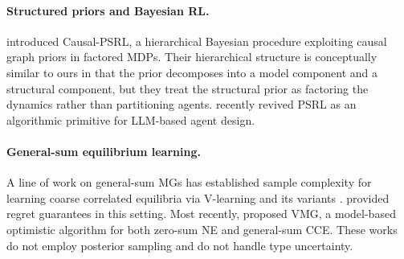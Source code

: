 \documentclass{article}
\begin{document}
\paragraph{Structured priors and Bayesian RL.}
\citet{mutti2024exploiting} introduced Causal-PSRL, a hierarchical Bayesian procedure exploiting causal graph priors in factored MDPs. Their hierarchical structure is conceptually similar to ours in that the prior decomposes into a model component and a structural component, but they treat the structural prior as factoring the dynamics rather than partitioning agents. \citet{arumugam2026toward} recently revived PSRL as an algorithmic primitive for LLM-based agent design.

\paragraph{General-sum equilibrium learning.}
A line of work on general-sum MGs has established sample complexity for learning coarse correlated equilibria via V-learning and its variants \citep{jin2021v,song2022when,mao2023decentralized}. \citet{erez2023regret} provided regret guarantees in this setting. Most recently, \citet{cui2025incentivize} proposed VMG, a model-based optimistic algorithm for both zero-sum NE and general-sum CCE. These works do not employ posterior sampling and do not handle type uncertainty.
\end{document}
